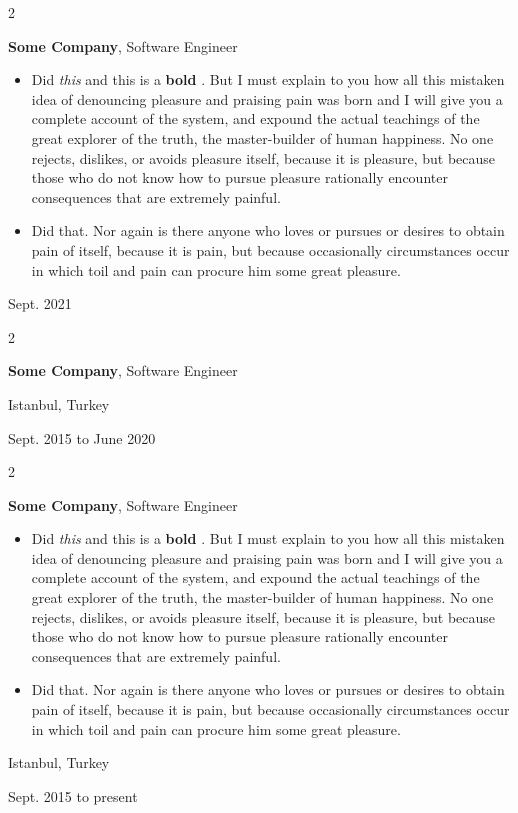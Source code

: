 \documentclass[10pt, letterpaper]{article}
\newenvironment{highlights}{
    \begin{itemize}[
        topsep=0.10 cm,
        parsep=0.10 cm,
        partopsep=0pt,
        itemsep=0pt,
        leftmargin=0.4 cm + 10pt
    ]
}{
    \end{itemize}
} %
\newenvironment{twocolentry}[2][]{
    \onecolentry
    \def\secondColumn{#2}
    \setcolumnwidth{\fill, 4.5 cm}
    \begin{paracol}{2}
}{
    \switchcolumn \raggedleft \secondColumn
    \end{paracol}
    \endonecolentry
} %
\let\hrefWithoutArrow\href
\renewcommand{\href}[2]{\hrefWithoutArrow{#1}{\mbox{\ifthenelse{\equal{#2}{}}{ }{#2 }\raisebox{.15ex}{\footnotesize \faExternalLink*}}}}
\begin{document}
        \vspace{0.2 cm}

        \begin{twocolentry}{
            Sept. 2021
        }
            \textbf{Some \textnormal{Company}}, Software Engineer
            \begin{highlights}
                \item Did \textit{this} and this is a \textbf{bold} \href{https://example.com}{link}. But I must explain to you how all this mistaken idea of denouncing pleasure and praising pain was born and I will give you a complete account of the system, and expound the actual teachings of the great explorer of the truth, the master-builder of human happiness. No one rejects, dislikes, or avoids pleasure itself, because it is pleasure, but because those who do not know how to pursue pleasure rationally encounter consequences that are extremely painful.
                \item Did that. Nor again is there anyone who loves or pursues or desires to obtain pain of itself, because it is pain, but because occasionally circumstances occur in which toil and pain can procure him some great pleasure.
            \end{highlights}
        \end{twocolentry}


        \vspace{0.2 cm}

        \begin{twocolentry}{
            Istanbul, Turkey

        Sept. 2015 to June 2020
        }
            \textbf{Some \textnormal{Company}}, Software Engineer
        \end{twocolentry}


        \vspace{0.2 cm}

        \begin{twocolentry}{
            Istanbul, Turkey

        Sept. 2015 to present
        }
            \textbf{Some \textnormal{Company}}, Software Engineer
            \begin{highlights}
                \item Did \textit{this} and this is a \textbf{bold} \href{https://example.com}{link}. But I must explain to you how all this mistaken idea of denouncing pleasure and praising pain was born and I will give you a complete account of the system, and expound the actual teachings of the great explorer of the truth, the master-builder of human happiness. No one rejects, dislikes, or avoids pleasure itself, because it is pleasure, but because those who do not know how to pursue pleasure rationally encounter consequences that are extremely painful.
                \item Did that. Nor again is there anyone who loves or pursues or desires to obtain pain of itself, because it is pain, but because occasionally circumstances occur in which toil and pain can procure him some great pleasure.
            \end{highlights}
        \end{twocolentry}
\end{document}

